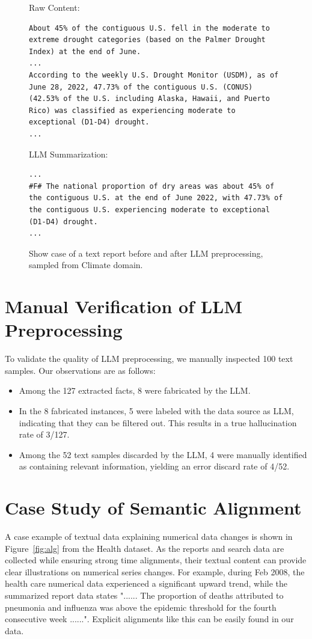 \begin{figure}[!h]
    \centering
    \begin{tcolorbox}
        Raw Content:
        \begin{lstlisting}
About 45% of the contiguous U.S. fell in the moderate to extreme drought categories (based on the Palmer Drought Index) at the end of June.
...
According to the weekly U.S. Drought Monitor (USDM), as of June 28, 2022, 47.73% of the contiguous U.S. (CONUS) (42.53% of the U.S. including Alaska, Hawaii, and Puerto Rico) was classified as experiencing moderate to exceptional (D1-D4) drought.
...
        \end{lstlisting}
        LLM Summarization:
        \begin{lstlisting}
...
#F# The national proportion of dry areas was about 45% of the contiguous U.S. at the end of June 2022, with 47.73% of the contiguous U.S. experiencing moderate to exceptional (D1-D4) drought.
...
        \end{lstlisting}
    \end{tcolorbox}
    \caption{Show case of a text report before and after LLM preprocessing, sampled from Climate domain.}
    \label{fig:LLM_showcase}
\end{figure}

\section{Manual Verification of LLM Preprocessing}\label{app:manual}
To validate the quality of LLM preprocessing, we manually inspected 100 text samples. Our observations are as follows:
\begin{itemize}
    \item Among the 127 extracted facts, 8 were fabricated by the LLM.
    \item In the 8 fabricated instances, 5 were labeled with the data source as LLM, indicating that they can be filtered out. This results in a true hallucination rate of 3/127.
    \item Among the 52 text samples discarded by the LLM, 4 were manually identified as containing relevant information, yielding an error discard rate of 4/52.
\end{itemize}
\newpage
\section{Case Study of Semantic Alignment}
A case example of textual data explaining numerical data changes is shown in Figure~\ref{fig:alg} from the Health dataset. As the reports and search data are collected while ensuring strong time alignments, their
textual content can provide clear illustrations on numerical series changes. For example,
during Feb 2008, the health care numerical data experienced a significant upward trend,
while the summarized report data states "...... The proportion of deaths attributed to pneumonia
and influenza was above the epidemic threshold for the fourth consecutive week ......". Explicit
alignments like this can be easily found in our data.

